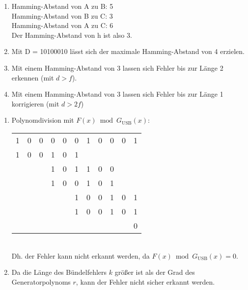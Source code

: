 \documentclass[12pt]{scrartcl}
\begin{document}
\setcounter{exnum}{1}
    \begin{enumerate}[label=(\alph*)]
        \item   Hamming-Abstand von A zu B: 5\\
                Hamming-Abstand von B zu C: 3\\
                Hamming-Abstand von A zu C: 6\\
                Der Hamming-Abstand von h ist also 3.
        \item   Mit D = 10100010 lässt sich der maximale Hamming-Abstand von 4 erzielen.
        \item   Mit einem Hamming-Abstand von 3 lassen sich Fehler bis zur Länge 2 erkennen (mit $d > f$).
        \item   Mit einem Hamming-Abstand von 3 lassen sich Fehler bis zur Länge 1 korrigieren (mit $d > 2f$)
    \end{enumerate}
 
\setcounter{exnum}{2}
    \begin{enumerate}[label=(\alph*)]
        \item Polynomdivision mit $F(x) \bmod G_\text{USB}(x)$:\\
        \begin{tabular}{c c c c c c c c c c c}
        1 & 0 & 0 & 0 & 0 & 0 & 1 & 0 & 0 & 0 & 1 \\
        1 & 0 & 0 & 1 & 0 & 1 \\
        \cline{1-6}
          &   &   & 1 & 0 & 1 & 1 & 0 & 0 \\
          &   &   & 1 & 0 & 0 & 1 & 0 & 1 \\
        \cline{4-9}
          &   &   &   &   & 1 & 0 & 0 & 1 & 0 & 1 \\
          &   &   &   &   & 1 & 0 & 0 & 1 & 0 & 1 \\
        \cline{6-11}
          &   &   &   &   &   &   &   &   &   & 0 \\
        \end{tabular}\\
        Dh. der Fehler kann nicht erkannt werden, da $F(x) \bmod G_\text{USB}(x) = 0$.
        \item Da die Länge des Bündelfehlers $k$ größer ist als der Grad des Generatorpolynoms $r$, 
        kann der Fehler nicht sicher erkannt werden.
    \end{enumerate}
\end{document}
